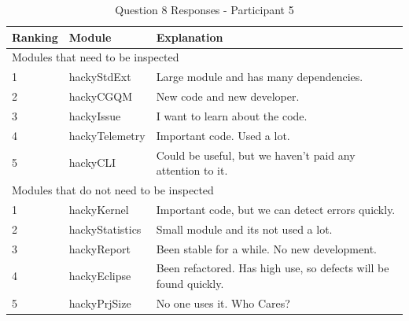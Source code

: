 \begin{table}[!h]
  \begin{center}
    \caption{Question 8 Responses - Participant 5}
    \label{tab:pre-selection-questionnaire-results-8-p5}
    \begin{tabular}{|p{2.0cm}|p{4.0cm}|p{7.0cm}|} \hline
{\bf Ranking} & {\bf Module} & {\bf Explanation} \\ \hline
\multicolumn{3}{|p{13.0cm}|}{Modules that need to be inspected} \\ \hline
1 & hackyStdExt & Large module and has many dependencies. \\ \hline
2 & hackyCGQM & New code and new developer. \\ \hline
3 & hackyIssue & I want to learn about the code. \\ \hline
4 & hackyTelemetry & Important code. Used a lot. \\ \hline
5 & hackyCLI & Could be useful, but we haven't paid any attention to it. \\ \hline
\multicolumn{3}{|p{13.0cm}|}{Modules that do not need to be inspected} \\ \hline
1 & hackyKernel & Important code, but we can detect errors quickly. \\ \hline
2 & hackyStatistics & Small module and its not used a lot. \\ \hline
3 & hackyReport & Been stable for a while. No new development. \\ \hline
4 & hackyEclipse & Been refactored. Has high use, so defects will be
found quickly. \\ \hline
5 & hackyPrjSize & No one uses it. Who Cares? \\ \hline
    \end{tabular}
  \end{center}
\end{table}



